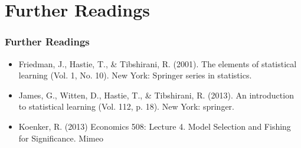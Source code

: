 \documentclass[
  shownotes,
  xcolor={svgnames},
  hyperref={colorlinks,citecolor=DarkBlue,linkcolor=DarkRed,urlcolor=DarkBlue}
  , aspectratio=169]{beamer}
\begin{document}
\section{Further Readings}
\begin{frame}
\frametitle{Further Readings}

\begin{itemize}


  \item Friedman, J., Hastie, T., \& Tibshirani, R. (2001). The elements of statistical learning (Vol. 1, No. 10). New York: Springer series in statistics.
  \medskip
  \item James, G., Witten, D., Hastie, T., \& Tibshirani, R. (2013). An introduction to statistical learning (Vol. 112, p. 18). New York: springer.
  \medskip
    \item Koenker, R. (2013) Economics 508: Lecture 4. Model Selection and Fishing for Significance. Mimeo

  
\end{itemize}

\end{frame}

\end{document}
